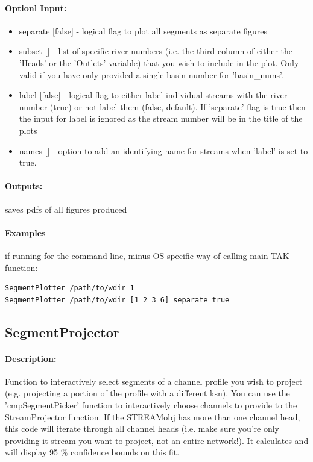 \paragraph{Optionl Input:}
\begin{itemize}
\item separate [false] - logical flag to plot all segments as separate figures 
\item subset [] - list of specific river numbers (i.e. the third column of either the 'Heads' or the 'Outlets' variable) that you wish to include
in the plot. Only valid if you have only provided a single basin number for 'basin\_nums'.
\item label [false]  - logical flag to either label individual streams with the river number (true) or not label them (false, default). If 'separate' flag
is true then the input for label is ignored as the stream number will be in the title of the plots
\item names [] - option to add an identifying name for streams when 'label' is set to true.
\end{itemize}

\paragraph{Outputs:}
saves pdfs of all figures produced

\paragraph{Examples} if running for the command line, minus OS specific way of calling main TAK function:
\begin{lstlisting}[language=bash]
SegmentPlotter /path/to/wdir 1
SegmentPlotter /path/to/wdir [1 2 3 6] separate true
\end{lstlisting}

\subsection{SegmentProjector}
\paragraph{Description:}
Function to interactively select segments of a channel profile you wish to project (e.g. projecting a portion of the profile with a different ksn).
You can use the 'cmpSegmentPicker' function to interactively choose channels to provide to the StreamProjector function. If the STREAMobj has more than 
one channel head, this code will iterate through all channel heads (i.e. make sure you're only providing it stream you want to project, not an entire
network!). It calculates and will display 95 \% confidence bounds on this fit.

